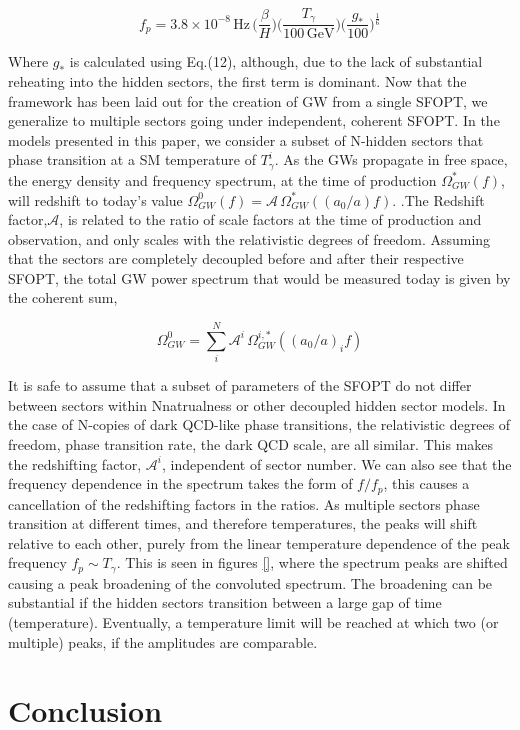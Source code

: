 \documentclass[nofootinbib,twocolumn,preprintnumbers]{revtex4-1}
\begin{document}
\begin{equation}
f_{p} = 3.8 \times 10^{-8} \, \textrm{Hz}\, \bigg( \frac{\beta}{H}\bigg)\bigg(\frac{T_{\gamma}}{100 \, \textrm{GeV}}\bigg)\bigg(\frac{g_{*}}{100}\bigg)^{\frac{1}{6}}
\end{equation}

 Where $g_*$  is calculated using Eq.(12), although, due to the lack of substantial reheating into the hidden sectors, the first term is dominant. Now that the framework has been laid out for the creation of GW from a single SFOPT, we generalize to multiple sectors going under independent, coherent SFOPT. In the models presented in this paper, we consider a subset of N-hidden sectors that phase transition at a SM temperature of $T_{\gamma}^{i}$. As the GWs propagate in free space, the energy density and frequency spectrum, at the time of production $\Omega_{GW}^{*}(f)$, will redshift to today's value $\Omega_{GW}^{0}(f) = \mathcal{A}\, \Omega_{GW}^{*}((a_{0}/a) f) $. .The Redshift factor,$\mathcal{A}$, is related to the ratio of scale factors at the time of production and observation, and only scales with the relativistic degrees of freedom.  Assuming that the sectors are completely decoupled before and after their respective SFOPT, the total GW power spectrum that would be measured today is given by the coherent sum,

\begin{equation}
\Omega_{GW}^{0} =  \sum_{i}^{N} \mathcal{A}^{i}\, \Omega_{GW}^{i,*}((a_{0}/a)_{i} f) 
\end{equation}

It is safe to assume that a subset of parameters of the SFOPT do not differ between sectors within Nnatrualness or other decoupled hidden sector models. In the case of N-copies of dark QCD-like phase transitions, the relativistic degrees of freedom, phase transition rate,  the dark QCD scale, are all similar. This makes the redshifting factor, $\mathcal{A}^i$, independent of sector number. We can also see that the frequency dependence in the spectrum takes the form of $f/f_{p}$, this causes a cancellation of the redshifting factors in the ratios. As multiple sectors phase transition at different times, and therefore temperatures, the peaks will shift relative to each other, purely from the linear temperature dependence of the peak frequency $f_{p} \sim T_{\gamma}$.  This is seen in figures \ref{}, where the spectrum peaks are shifted causing a peak broadening of the convoluted spectrum. The broadening can be substantial if the hidden sectors transition between a large gap of time (temperature). Eventually, a temperature limit will be reached at which two (or multiple) peaks, if the amplitudes are comparable. 


\section{Conclusion}
\label{sec:conclusion}


\appendix



\end{document}
